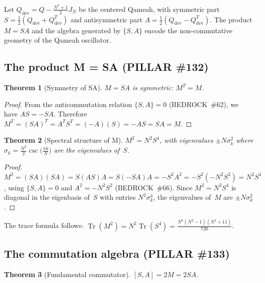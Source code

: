 \documentclass[aps,prd,twocolumn,superscriptaddress,floatfix,nofootinbib]{revtex4-2}
\newtheorem{theorem}{Theorem}
\theoremstyle{definition}
\theoremstyle{remark}
\begin{document}
Let $Q_{\mathrm{dev}} = Q - \frac{N^2+1}{2}J_N$ be the centered Qameah,
with symmetric part $S = \tfrac{1}{2}(Q_{\mathrm{dev}} + Q_{\mathrm{dev}}^T)$
and antisymmetric part $A = \tfrac{1}{2}(Q_{\mathrm{dev}} - Q_{\mathrm{dev}}^T)$.
The product $M = SA$ and the algebra generated by $\{S, A\}$
encode the non-commutative geometry of the Qameah oscillator.

\subsection{The product M = SA (PILLAR \#132)}
\label{ssec:product-m}

\begin{theorem}[Symmetry of SA]\label{thm:sa-symmetric}
  $M = SA$ is symmetric: $M^T = M$.
\end{theorem}

\begin{proof}
  From the anticommutation relation $\{S, A\} = 0$ (BEDROCK~\#62),
  we have $AS = -SA$. Therefore
  $M^T = (SA)^T = A^T S^T = (-A)(S) = -AS = SA = M$.
\end{proof}

\begin{theorem}[Spectral structure of M]\label{thm:m-spectral}
  $M^2 = N^2 S^4$, with eigenvalues $\pm N\sigma_k^2$ where
  $\sigma_k = \frac{N^2}{2}\csc\bigl(\frac{\pi k}{N}\bigr)$
  are the eigenvalues of~$S$.
\end{theorem}

\begin{proof}
  $M^2 = (SA)(SA) = S(AS)A = S(-SA)A = -S^2 A^2 = -S^2(-N^2 S^2) = N^2 S^4$,
  using $\{S,A\}=0$ and $A^2 = -N^2 S^2$ (BEDROCK~\#66).
  Since $M^2 = N^2 S^4$ is diagonal in the eigenbasis of~$S$
  with entries $N^2 \sigma_k^4$, the eigenvalues of~$M$
  are $\pm N\sigma_k^2$.
\end{proof}

The trace formula follows: $\operatorname{Tr}(M^2) = N^2\operatorname{Tr}(S^4)
= \frac{N^6(N^2-1)(N^2+11)}{720}$.

\subsection{The commutation algebra (PILLAR \#133)}
\label{ssec:sa-commutator}

\begin{theorem}[Fundamental commutator]\label{thm:sa-commutator}
  $[S, A] = 2M = 2SA$.
\end{theorem}
\end{document}
